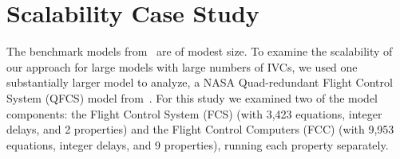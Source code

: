 \section{Scalability Case Study}

\label{sec:qfc}
The benchmark models from~\cite{expr} are of modest size.  To examine the scalability of our approach for large models with large numbers of IVCs, we used one substantially larger model to analyze, a NASA Quad-redundant Flight Control System (QFCS) model from~\cite{NFM2015:backes}. %
For this study we examined two of the model components: the Flight Control System (FCS) (with 3,423 equations,  integer delays, and 2 properties) and the Flight Control Computers (FCC) (with 9,953 equations,  integer delays, and 9 properties), running each property separately.  




